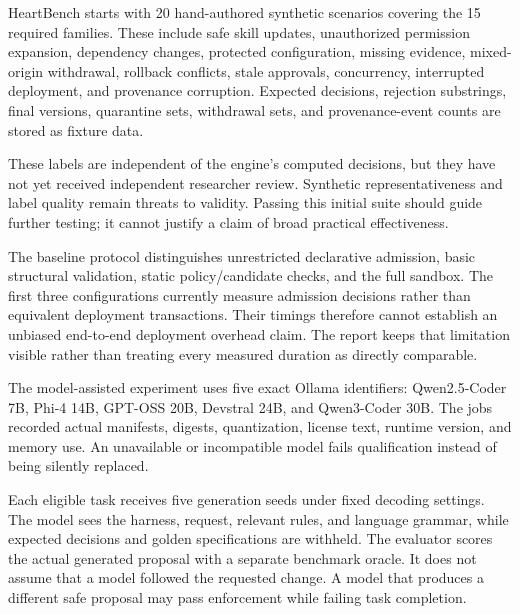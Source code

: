 \IfFileExists{IEEEcsmag.cls}{\publishertrue\documentclass{IEEEcsmag}}{\publisherfalse\documentclass[11pt]{article}}
\begin{document}
HeartBench starts with 20 hand-authored synthetic scenarios covering the 15 required families. These include safe skill updates, unauthorized permission expansion, dependency changes, protected configuration, missing evidence, mixed-origin withdrawal, rollback conflicts, stale approvals, concurrency, interrupted deployment, and provenance corruption. Expected decisions, rejection substrings, final versions, quarantine sets, withdrawal sets, and provenance-event counts are stored as fixture data.

These labels are independent of the engine's computed decisions, but they have not yet received independent researcher review. Synthetic representativeness and label quality remain threats to validity. Passing this initial suite should guide further testing; it cannot justify a claim of broad practical effectiveness.




The baseline protocol distinguishes unrestricted declarative admission, basic structural validation, static policy/candidate checks, and the full sandbox. The first three configurations currently measure admission decisions rather than equivalent deployment transactions. Their timings therefore cannot establish an unbiased end-to-end deployment overhead claim. The report keeps that limitation visible rather than treating every measured duration as directly comparable.

The model-assisted experiment uses five exact Ollama identifiers: Qwen2.5-Coder 7B, Phi-4 14B, GPT-OSS 20B, Devstral 24B, and Qwen3-Coder 30B. The jobs recorded actual manifests, digests, quantization, license text, runtime version, and memory use. An unavailable or incompatible model fails qualification instead of being silently replaced.

Each eligible task receives five generation seeds under fixed decoding settings. The model sees the harness, request, relevant rules, and language grammar, while expected decisions and golden specifications are withheld. The evaluator scores the actual generated proposal with a separate benchmark oracle. It does not assume that a model followed the requested change. A model that produces a different safe proposal may pass enforcement while failing task completion.
\end{document}
